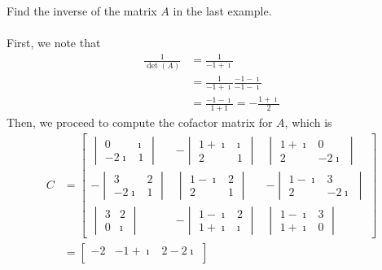 \begin{exmp}
Find the inverse of the matrix $A$ in the last example.\\
\\
First, we note that
\begin{align*}
\frac{1}{\det(A)} &= \frac{1}{-1+\imath} \\
&= \frac{1}{-1+\imath} \frac{-1-\imath}{-1-\imath} \\
&= \frac{-1-\imath}{1+1} = -\frac{1+\imath}{2}
\end{align*}
Then, we proceed to compute the cofactor matrix for $A$, which is
\begin{align*}
C &=
\begin{bmatrix}
\begin{vmatrix}
0 & \imath \\
-2\imath & 1
\end{vmatrix} &
-\begin{vmatrix}
1+\imath & \imath \\
2 & 1
\end{vmatrix} &
\begin{vmatrix}
1+\imath & 0 \\
2 & -2\imath
\end{vmatrix} \\
-\begin{vmatrix}
3 & 2 \\
-2\imath & 1
\end{vmatrix} &
\begin{vmatrix}
1-\imath & 2 \\
2 & 1
\end{vmatrix} &
-\begin{vmatrix}
1-\imath & 3 \\
2 & -2\imath
\end{vmatrix} \\
\begin{vmatrix}
3 & 2 \\
0 & \imath
\end{vmatrix} &
-\begin{vmatrix}
1-\imath & 2 \\
1+\imath & \imath
\end{vmatrix} &
\begin{vmatrix}
1-\imath & 3 \\
1+\imath & 0
\end{vmatrix}
\end{bmatrix} \\
&= 
\begin{bmatrix}
-2 & -1+\imath & 2-2\imath \\

\end{bmatrix}
\end{align*}
\end{exmp}
